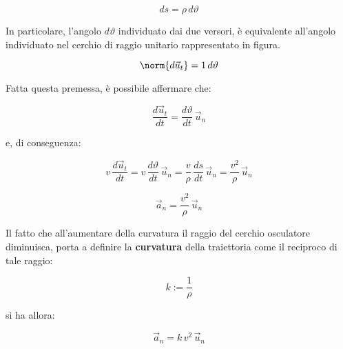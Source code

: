 \[
	ds=\rho\,d\vartheta
\]

In particolare, l'angolo $d\vartheta$ individuato dai due versori, è equivalente all'angolo individuato nel cerchio di raggio unitario rappresentato in figura.

\[
	\norm{d\vec{u}_t}=1\,d\vartheta
\]

Fatta questa premessa, è possibile affermare che:

\[
	\frac{d\vec{u}_t}{dt}=\frac{d\vartheta}{dt}\,\vec{u}_n
\]

e, di conseguenza:

\[
	v\,\frac{d\vec{u}_t}{dt}= v\,\frac{d\vartheta}{dt}\,\vec{u}_n=\frac{v}{\rho}\,\frac{ds}{dt}\,\vec{u}_n=\frac{v^2}{\rho}\,\vec{u}_n
\]

\begin{equation}
	\boxed{\vec{a}_n=\frac{v^2}{\rho}\,\vec{u}_n}
\end{equation}

Il fatto che all'aumentare della curvatura il raggio del cerchio osculatore diminuisca, porta a definire la \textbf{curvatura} della traiettoria come il reciproco di tale raggio:

\[
	k:=\frac{1}{\rho}
\]

si ha allora:

\[
	\vec{a}_n=k\,{v^2}\,\vec{u}_n
\]

